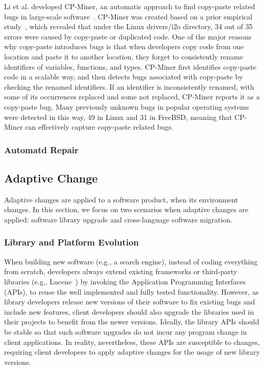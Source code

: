 \documentclass[runningheads,a4paper]{llncs}
\begin{document}
Li et al. developed CP-Miner, an automatic approach to find copy-paste related bugs in large-scale software~\cite{Li2006:CPMiner}. CP-Miner was created based on a prior empirical study~\cite{Chou2001:ESO}, which revealed that under the Linux {\sf drivers/i2o} directory, 34 out of 35 errors were caused by copy-paste or duplicated code. 
One of the major reasons why copy-paste introduces bugs is that when developers copy code from one location and paste it to another location, they forget to consistently rename identifiers of variables, functions, and types. CP-Miner first identifies copy-paste code in a scalable way, and then detects bugs associated with copy-paste by checking the renamed identifiers. If an identifier is inconsistently renamed, with some of its occurrences replaced and some not replaced, CP-Miner reports it as a copy-paste bug. Many previously unknown bugs in popular operating systems were detected in this way, 49 in Linux and 31 in FreeBSD, meaning that CP-Miner can effectively capture copy-paste related bugs. 


\subsubsection{Automatd Repair} 

\subsection{Adaptive Change}
\label{sec:adaptive}
Adaptive changes are applied to a software product, when its environment changes. In this section, we focus on two scenarios when adaptive changes are applied: software library upgrade and cross-language software migration.


\subsubsection{Library and Platform Evolution} 
When building new software (e.g., a search engine), instead of coding everything from scratch, developers always extend existing frameworks or third-party libraries (e.g., Lucene~\cite{lucene}) by invoking the Application Programming Interfaces (APIs), to reuse the well implemented and fully tested functionality. However, as library developers release new versions of their software to fix existing bugs and include new features, client developers should also upgrade the libraries used in their projects to benefit from the newer versions. Ideally, the library APIs should be stable so that such software upgrades do not incur any program change in client applications. In reality, nevertheless, these APIs are susceptible to changes, requiring client developers to apply adaptive changes for the usage of new library versions. 
\end{document}
